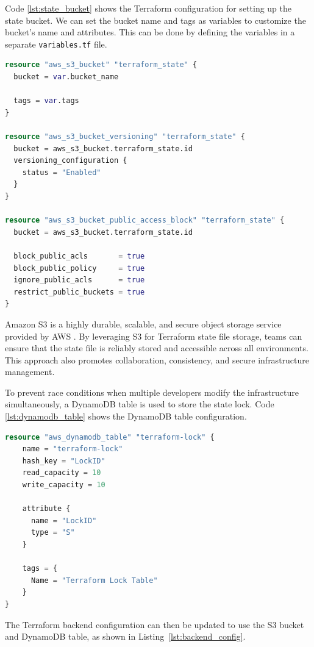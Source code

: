Code \ref{lst:state_bucket} shows the Terraform configuration for setting up the state bucket. We can set the bucket name and tags as variables to customize the bucket's name and attributes. This can be done by defining the variables in a separate \texttt{variables.tf} file.

\begin{lstlisting}[language=Terraform, caption={Terraform Configuration for Setting Up State Bucket}, label={lst:state_bucket}]
resource "aws_s3_bucket" "terraform_state" {
  bucket = var.bucket_name

  tags = var.tags
}

resource "aws_s3_bucket_versioning" "terraform_state" {
  bucket = aws_s3_bucket.terraform_state.id
  versioning_configuration {
    status = "Enabled"
  }
}

resource "aws_s3_bucket_public_access_block" "terraform_state" {
  bucket = aws_s3_bucket.terraform_state.id

  block_public_acls       = true
  block_public_policy     = true
  ignore_public_acls      = true
  restrict_public_buckets = true
}
\end{lstlisting}

Amazon S3 is a highly durable, scalable, and secure object storage service provided by AWS \cite{s3}. By leveraging S3 for Terraform state file storage, teams can ensure that the state file is reliably stored and accessible across all environments. This approach also promotes collaboration, consistency, and secure infrastructure management.

To prevent race conditions when multiple developers modify the infrastructure simultaneously, a DynamoDB table \cite{dynamodb} is used to store the state lock. Code \ref{lst:dynamodb_table} shows the DynamoDB table configuration.

\begin{lstlisting}[language=Terraform, caption={Terraform Configuration for Setting Up DynamoDB Table}, label={lst:dynamodb_table}]
resource "aws_dynamodb_table" "terraform-lock" {
    name = "terraform-lock"
    hash_key = "LockID"
    read_capacity = 10
    write_capacity = 10
    
    attribute {
      name = "LockID"
      type = "S"
    }
    
    tags = {
      Name = "Terraform Lock Table"
    }
}
\end{lstlisting}

The Terraform backend configuration can then be updated to use the S3 bucket and DynamoDB table, as shown in Listing~\ref{lst:backend_config}.

